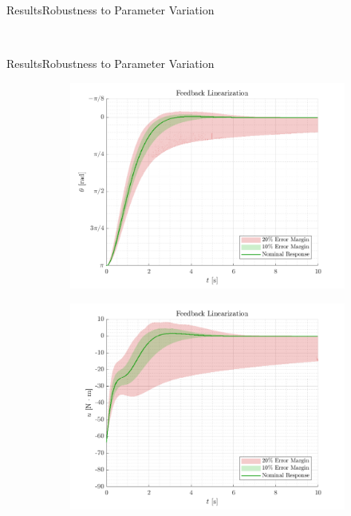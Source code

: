 \begin{frame}{Results}{Robustness to Parameter Variation}
\begin{figure}[H]
\begin{minipage}{0.45\linewidth}
\begin{figure}[H]
    \end{figure}                
  \end{minipage}\hfill \\
\end{figure}
\end{frame}

\begin{frame}{Results}{Robustness to Parameter Variation}
\begin{figure}[H]
  \begin{minipage}{0.45\linewidth}
    \begin{figure}[H]
      \centering
      \includegraphics[width=\linewidth]{figures/feedbackLinearization}
    \end{figure}        
  \end{minipage}\hfill      
  \begin{minipage}{0.45\linewidth}
    \begin{figure}[H]
      \centering
      \includegraphics[width=1\linewidth]{figures/feedbackLinearization_u}
    \end{figure}                
  \end{minipage}\hfill \\
\end{figure}
\end{frame}

